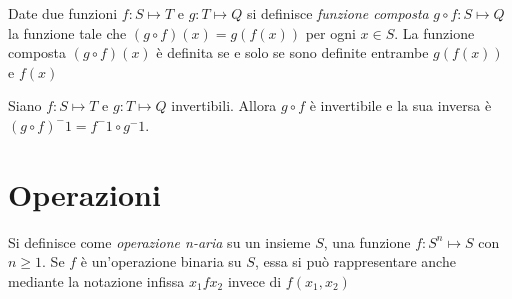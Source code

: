 Date due funzioni $f:S \mapsto T$ e $g:T \mapsto Q$ si definisce \emph{funzione composta}
$g \circ f:S \mapsto Q$ la funzione tale che $(g \circ f)(x) = g(f(x))$ per ogni $x \in S$.
La funzione composta $(g \circ f)(x)$ è definita se e solo se sono definite entrambe
$g(f(x))$ e $f(x)$


Siano $f:S \mapsto T$ e $g:T \mapsto Q$ invertibili. Allora $g \circ f$ è invertibile
e la sua inversa è $(g \circ f) ^ -1 = f^-1 \circ g ^ -1$.

\section{Operazioni}
Si definisce come \emph{operazione n-aria} su un insieme $S$, una funzione
$f:S^n \mapsto S$ con $n \geq 1$.
Se $f$ è un'operazione binaria su $S$, essa si può rappresentare anche mediante
la notazione infissa $x_1 f x_2$ invece di $f(x_1,x_2)$

